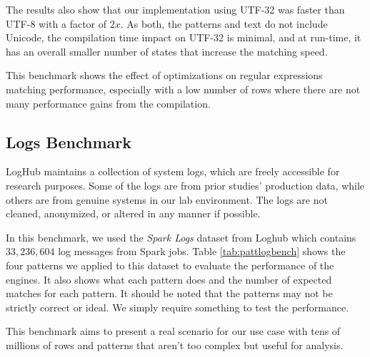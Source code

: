 The results also show that our implementation using UTF-32 was faster than UTF-8 with a factor of $2x$. As both, the patterns and text do not include Unicode, the compilation time impact on UTF-32 is minimal, and at run-time, it has an overall smaller number of states that increase the matching speed.

This benchmark shows the effect of optimizations on regular expressions matching performance, especially with a low number of rows where there are not many performance gains from the compilation.

\subsection{Logs Benchmark}

LogHub \cite{loghub} maintains a collection of system logs, which are freely accessible for research purposes. Some of the logs are from prior studies' production data, while others are from genuine systems in our lab environment. The logs are not cleaned, anonymized, or altered in any manner if possible.

In this benchmark, we used the \textit{Spark Logs} dataset from Loghub which contains $33,236,604$ log messages from Spark jobs. Table \ref{tab:pattlogbench} shows the four patterns we applied to this dataset to evaluate the performance of the engines. It also shows what each pattern does and the number of expected matches for each pattern. It should be noted that the patterns may not be strictly correct or ideal. We simply require something to test the performance.

This benchmark aims to present a real scenario for our use case with tens of millions of rows and patterns that aren't too complex but useful for analysis.

